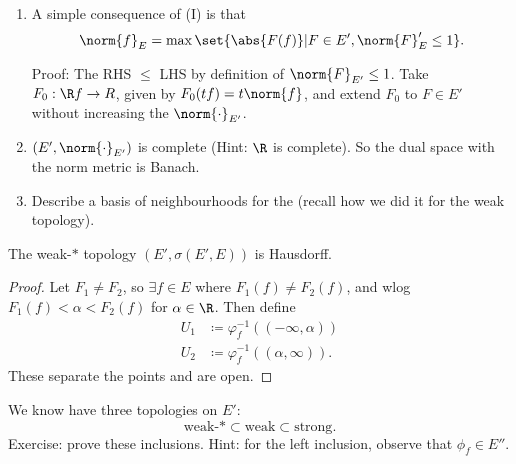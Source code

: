 \documentclass[twoside]{article}
\begin{document}
\begin{ex}\leavevmode
    \begin{enumerate}[label=(\arabic*)]
      \item A simple consequence of  (I) is that
            \begin{equation*}
                \norm{f}_E = \max\set{\abs{F(f)} | F \in E', \norm{F}_E' \leq 1}.
            \end{equation*}

            Proof: The RHS $\leq$ LHS by definition of $\norm{F}_{E'} \leq 1$.
            Take $F_0: \R f \to R$, given by $F_0(tf) = t \norm{f}$, and extend $F_0$ to $F \in E'$ without increasing the $\norm{\cdot}_{E'}$.
        \item $(E', \norm{\cdot}_{E'})$ is complete (Hint: $\R$ is complete). So the dual space with the norm metric is Banach.
        \item Describe a basis of neighbourhoods for the (recall how we did it for the weak topology).
    \end{enumerate}
\end{ex}
\begin{prop}
    The weak-$*$ topology $(E', \sigma(E', E))$ is Hausdorff.
\end{prop}
\begin{proof}
    Let $F_1 \neq F_2$, so $\exists f \in E$ where $F_1(f) \neq F_2(f)$, and wlog $F_1(f) < \alpha < F_2(f)$ for $\alpha \in \R$.
    Then define
    \begin{align*}
        U_1 &\coloneqq \varphi_f^{-1}((-\infty, \alpha)) \\
        U_2 &\coloneqq \varphi_f^{-1}((\alpha, \infty)).
    \end{align*}
    These separate the points and are open.
\end{proof}
\begin{remark}
    We know have three topologies on $E'$:
    \begin{equation*}
        \text{weak-}* \subset \text{weak} \subset \text{strong}.
    \end{equation*}
    Exercise: prove these inclusions. Hint: for the left inclusion, observe that $\phi_f \in E''$.
\end{remark}
\end{document}
